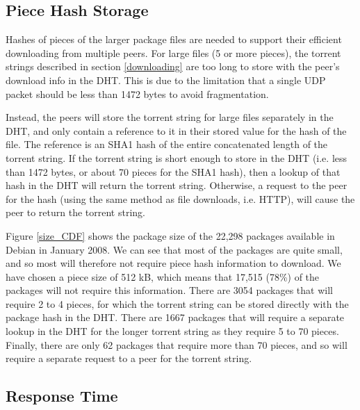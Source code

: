 \documentclass[conference]{IEEEtran}
\begin{document}
\subsection{Piece Hash Storage}
\label{pieces}

Hashes of pieces of the larger package files are needed to support
their efficient downloading from multiple peers.
For large files (5 or more pieces), the torrent strings described in
section \ref{downloading}
are too long to store with the peer's download info in the DHT. This
is due to the limitation that a single UDP packet should be less
than 1472 bytes to avoid fragmentation.

Instead, the peers will store the torrent string for large files
separately in the DHT, and only contain a reference to it in their
stored value for the hash of the file. The reference is an SHA1 hash
of the entire concatenated length of the torrent string. If the
torrent string is short enough to store in the DHT (i.e. less than
1472 bytes, or about 70 pieces for the SHA1 hash), then a lookup of
that hash in the DHT will return the torrent string. Otherwise, a
request to the peer for the hash (using the same method as file
downloads, i.e. HTTP), will cause the peer to return the torrent
string.

Figure \ref{size_CDF} shows the package size of the 22,298 packages
available in Debian in January 2008. We can see that most of the
packages are quite small, and so most will therefore not require
piece hash information to download. We have chosen a piece
size of 512 kB, which means that 17,515 (78\%) of the packages will
not require this information. There are 3054 packages that will
require 2 to 4 pieces, for which the torrent string can be stored
directly with the package hash in the DHT. There are 1667 packages
that will require a separate lookup in the DHT for the longer
torrent string as they require 5 to 70 pieces. Finally, there are
only 62 packages that require more than 70 pieces, and so will
require a separate request to a peer for the torrent string.

\subsection{Response Time}
\label{response_time}
\end{document}
